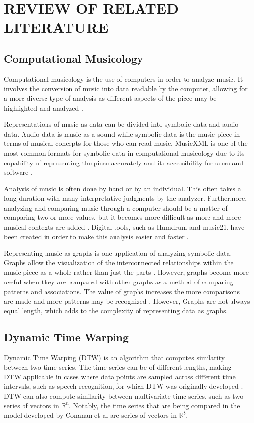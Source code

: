 \chapter{REVIEW OF RELATED LITERATURE}


\section{Computational Musicology}
Computational musicology is the use of computers in order to analyze music. It involves the conversion of music into data readable by the computer, allowing for a more diverse type of analysis as different aspects of the piece may be highlighted and analyzed \cite{ClarkCook}.

Representations of music as data can be divided into symbolic data and audio data. Audio data is music as a sound while symbolic data is the music piece in terms of musical concepts for those who can read music. MusicXML is one of the most common formats for symbolic data in computational musicology due to its capability of representing the piece accurately and its accessibility for users and software \cite{MusicXMLStandard}.

Analysis of music is often done by hand or by an individual. This often takes a long duration with many interpretative judgments by the analyzer. Furthermore, analyzing and comparing music through a computer should be a matter of comparing two or more values, but it becomes more difficult as more and more musical contexts are added \cite{ClarkCook}. Digital tools, such as Humdrum and music21, have been created in order to make this analysis easier and faster \cite{ClarkCook, music21Creation}.

Representing music as graphs is one application of analyzing symbolic data. Graphs allow the visualization of the interconnected relationships within the music piece as a whole rather than just the parts \cite{ClarkCook, HernandezOlivanBeltran}. However, graphs become more useful when they are compared with other graphs as a method of comparing patterns and associations. The value of graphs increases the more comparisons are made and more patterns may be recognized \cite{ClarkCook}. However, Graphs are not always equal length, which adds to the complexity of representing data as graphs.

\section{Dynamic Time Warping}
Dynamic Time Warping (DTW) is an algorithm that computes similarity between two time series. The time series can be of different lengths, making DTW applicable in cases where data points are sampled across different time intervals, such as speech recognition, for which DTW was originally developed \cite{sakoe}. DTW can also compute similarity between multivariate time series, such as two series of vectors in $\mathbb{R}^n$. Notably, the time series that are being compared in the model developed by Conanan et al are series of vectors in $\mathbb{R}^8$.


